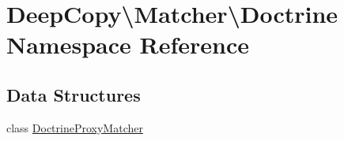 \hypertarget{namespace_deep_copy_1_1_matcher_1_1_doctrine}{}\section{Deep\+Copy\textbackslash{}Matcher\textbackslash{}Doctrine Namespace Reference}
\label{namespace_deep_copy_1_1_matcher_1_1_doctrine}
\subsection*{Data Structures}
\begin{DoxyCompactItemize}
\item 
class \mbox{\hyperlink{class_deep_copy_1_1_matcher_1_1_doctrine_1_1_doctrine_proxy_matcher}{Doctrine\+Proxy\+Matcher}}
\end{DoxyCompactItemize}
